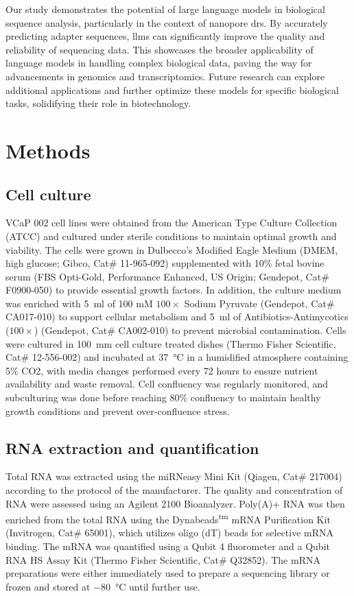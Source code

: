 \documentclass[pdflatex, sn-mathphys-num, lineno]{sn-jnl}%
\theoremstyle{thmstyleone}%
\theoremstyle{thmstyletwo}%
\theoremstyle{thmstylethree}%
\begin{document}
Our study demonstrates the potential of large language models in biological sequence analysis, particularly in the context of nanopore \gls{drs}.
By accurately predicting adapter sequences,  \glspl{llm} can significantly improve the quality and reliability of sequencing data.
This showcases the broader applicability of language models in handling complex biological data, paving the way for advancements in genomics and transcriptomics.
Future research can explore additional applications and further optimize these models for specific biological tasks, solidifying their role in biotechnology.


\section{Methods}\label{sec:methods}

\subsection{Cell culture}

VCaP 002 cell lines were obtained from the American Type Culture Collection (ATCC) and cultured under sterile conditions to maintain optimal growth and viability.
The cells were grown in Dulbecco's Modified Eagle Medium (DMEM, high glucose; Gibco, Cat\# 11-965-092) supplemented with 10\% fetal bovine serum (FBS Opti-Gold, Performance Enhanced, US Origin; Gendepot, Cat\# F0900-050) to provide essential growth factors.
In addition, the culture medium was enriched with \SI{5}{\ml} of 100 mM \( 100\times \) Sodium Pyruvate (Gendepot, Cat\# CA017-010) to support cellular metabolism and \SI{5}{\ml} of Antibiotics-Antimycotics (\( 100\times \)) (Gendepot, Cat\# CA002-010) to prevent microbial contamination.
Cells were cultured in \SI{100}{\mm} cell culture treated dishes (Thermo Fisher Scientific, Cat\# 12-556-002) and incubated at \SI{37}{\degreeCelsius} in a humidified atmosphere containing 5\% CO2, with media changes performed every 72 hours to ensure nutrient availability and waste removal.
Cell confluency was regularly monitored, and subculturing was done before reaching 80\% confluency to maintain healthy growth conditions and prevent over-confluence stress.

\subsection{RNA extraction and quantification}

Total RNA was extracted using the miRNeasy Mini Kit (Qiagen, Cat\# 217004) according to the protocol of the manufacturer.
The quality and concentration of RNA were assessed using an Agilent 2100 Bioanalyzer.
Poly(A)+ RNA was then enriched from the total RNA using the Dynabeads\textsuperscript{tm} mRNA Purification Kit (Invitrogen, Cat\# 65001), which utilizes oligo (dT) beads for selective mRNA binding.
The mRNA was quantified using a Qubit 4 fluorometer and a Qubit RNA HS Assay Kit (Thermo Fisher Scientific, Cat\# Q32852).
The mRNA preparations were either immediately used to prepare a sequencing library or frozen and stored at \SI{-80}{\degreeCelsius} until further use.
\end{document}
